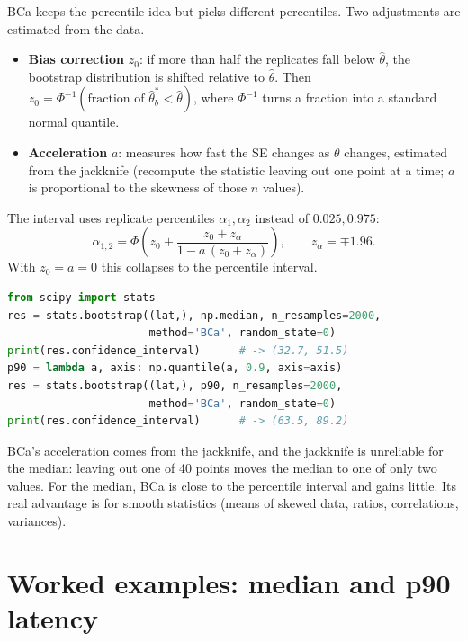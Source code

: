 BCa keeps the percentile idea but picks different percentiles. Two
adjustments are estimated from the data.
\begin{itemize}
  \item \textbf{Bias correction} $z_0$: if more than half the replicates fall
  below $\hat\theta$, the bootstrap distribution is shifted relative to
  $\hat\theta$. Then $z_0 = \Phi^{-1}(\text{fraction of } \hat\theta^*_b < \hat\theta)$,
  where $\Phi^{-1}$ turns a fraction into a standard normal quantile.
  \item \textbf{Acceleration} $a$: measures how fast the SE changes as
  $\theta$ changes, estimated from the jackknife (recompute the statistic
  leaving out one point at a time; $a$ is proportional to the skewness of
  those $n$ values).
\end{itemize}
The interval uses replicate percentiles $\alpha_1, \alpha_2$ instead of
$0.025, 0.975$:
\[
  \alpha_{1,2} = \Phi\!\left( z_0 + \frac{z_0 + z_{\alpha}}{1 - a\,(z_0 + z_{\alpha})} \right),
  \qquad z_\alpha = \mp 1.96 .
\]
With $z_0 = a = 0$ this collapses to the percentile interval.

\begin{lstlisting}[language=Python]
from scipy import stats
res = stats.bootstrap((lat,), np.median, n_resamples=2000,
                      method='BCa', random_state=0)
print(res.confidence_interval)      # -> (32.7, 51.5)
p90 = lambda a, axis: np.quantile(a, 0.9, axis=axis)
res = stats.bootstrap((lat,), p90, n_resamples=2000,
                      method='BCa', random_state=0)
print(res.confidence_interval)      # -> (63.5, 89.2)
\end{lstlisting}

\begin{trapbox}
BCa's acceleration comes from the jackknife, and the jackknife is unreliable
for the median: leaving out one of 40 points moves the median to one of only
two values. For the median, BCa is close to the percentile interval and gains
little. Its real advantage is for smooth statistics (means of skewed data,
ratios, correlations, variances).
\end{trapbox}

\section{Worked examples: median and p90 latency}
\label{sec:boot-worked}

